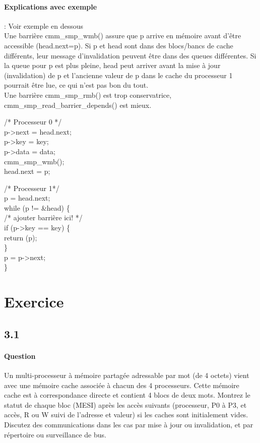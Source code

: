 \documentclass[oneside]{book}
\begin{document}
\paragraph{Explications avec exemple}: Voir exemple en dessous \\

Une barrière cmm\_smp\_wmb() assure que p arrive en mémoire avant d'être accessible (head.next=p). Si p et head sont dans des blocs/bancs de cache différents, leur message d'invalidation peuvent être dans des queues différentes. Si la queue pour p est plus pleine, head peut arriver avant la mise à jour (invalidation) de p et l'ancienne valeur de p dans le cache du processeur 1 pourrait être lue, ce qui n'est pas bon du tout.\\

Une barrière cmm\_smp\_rmb() est trop conservatrice, cmm\_smp\_read\_barrier\_depends() est mieux. 
\begin{multicols}{2}
/* Processeur 0 */\\
p->next = head.next;\\
p->key = key;\\
p->data = data;\\
cmm\_smp\_wmb();\\
head.next = p;\\

\columnbreak

/* Processeur 1*/\\
p = head.next;\\
while (p != \&head) \{\\
/* ajouter barrière ici! */\\
if (p->key == key) \{\\
return (p);\\
\}\\
p = p->next;\\
\}\\
\end{multicols}
\section{Exercice}
\subsection{3.1}
\paragraph{Question}
Un multi-processeur à mémoire partagée adressable par mot (de 4 octets) vient
avec une mémoire cache associée à chacun des 4 processeurs. Cette mémoire
cache est à correspondance directe et contient 4 blocs de deux mots. Montrez le
statut de chaque bloc (MESI) après les accès suivants (processeur, P0 à P3, et
accès, R ou W suivi de l'adresse et valeur) si les caches sont initialement vides.
Discutez des communications dans les cas par mise à jour ou invalidation, et par
répertoire ou surveillance de bus.
\end{document}
